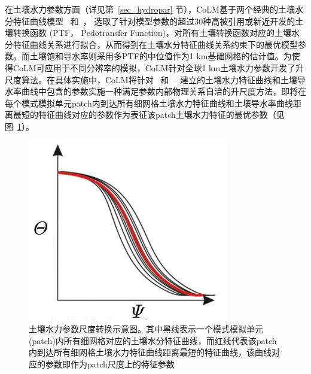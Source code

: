 在土壤水力参数方面（详见第~\ref{sec_hydropar} 节），CoLM基于两个经典的土壤水分特征曲线模型~\citet{campbell1974} 和~\citet{van1980closed}，
选取了针对模型参数的超过30种高被引用或新近开发的土壤转换函数 (PTF， Pedotransfer Function)，对所有土壤转换函数对应的土壤水分特征曲线关系进行拟合，从而得到在土壤水分特征曲线关系约束下的最优模型参数。而土壤饱和导水率则采用多PTF的中位值作为1 km基础网格的估计值。为使得CoLM可应用于不同分辨率的模拟，CoLM针对全球1 km土壤水力参数开发了升尺度算法。在具体实施中，CoLM将针对~\citet{campbell1974} 和~\citet{van1980closed}--\citet{mualem1976new} 建立的土壤水力特征曲线和土壤导水率曲线中包含的参数实施一种满足参数内部物理关系自洽的升尺度方法，即将在每个模式模拟单元patch内到达所有细网格土壤水力特征曲线和土壤导水率曲线距离最短的特征曲线对应的参数作为表征该patch土壤水力特征的最优参数（见图~\ref{fig:土壤水力参数尺度转换示意图}）。
{
\begin{figure}[htbp]
\centering
\includegraphics{Figures/尺度转换/土壤水力参数尺度转换示意图.png}
\caption[土壤水力参数尺度转换示意图]{土壤水力参数尺度转换示意图。其中黑线表示一个模式模拟单元(patch)内所有细网格对应的土壤水分特征曲线，而红线代表该patch内到达所有细网格土壤水力特征曲线距离最短的特征曲线，该曲线对应的参数即作为patch尺度上的特征参数}
\label{fig:土壤水力参数尺度转换示意图}
\end{figure}
}

